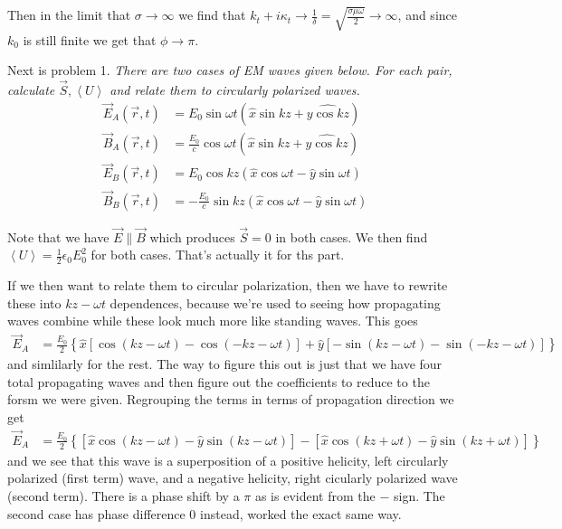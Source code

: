 \documentclass[10pt]{report}
\newcommand{\expvalue}[1]{\left<#1\right>}
\begin{document}
Then in the limit that $\sigma \to \infty$ we find that $k_t + i\kappa_t \to \frac{1}{\delta} = \sqrt{\frac{\sigma \mu \omega}{2}} \to \infty$, and since $k_0$ is still finite we get that $\phi \to \pi$. 

Next is problem 1. \emph{There are two cases of EM waves given below. For each pair, calculate $\vec{S}, \expvalue{U}$ and relate them to circularly polarized waves.}
\begin{align}
    \vec{E}_A(\vec{r},t) &= E_0\sin \omega t\left( \hat{x}\sin kz + \hat{y\cos kz} \right)\\
    \vec{B}_A(\vec{r},t) &= \frac{E_0}{c}\cos \omega t\left( \hat{x}\sin kz + \hat{y\cos kz} \right)\\
    \vec{E}_B(\vec{r},t) &= E_0\cos kz\left( \hat{x}\cos \omega t - \hat{y}\sin \omega t \right)\\
    \vec{B}_B(\vec{r},t) &= -\frac{E_0}{c}\sin kz\left( \hat{x}\cos \omega t - \hat{y}\sin \omega t \right)
\end{align}

Note that we have $\vec{E} \parallel \vec{B}$ which produces $\vec{S} = 0$ in both cases. We then find $\expvalue{U} = \frac{1}{2}\epsilon_0 E_0^2$ for both cases. That's actually it for ths part.

If we then want to relate them to circular polarization, then we have to rewrite these into $kz - \omega t$ dependences, because we're used to seeing how propagating waves combine while these look much more like standing waves. This goes
\begin{align}
    \vec{E}_A &= \frac{E_0}{2}\left\{ \hat{x}\left[ \cos(kz - \omega t) - \cos (-kz - \omega t) \right] + \hat{y}\left[ -\sin(kz - \omega t) - \sin(-kz - \omega t) \right] \right\}
\end{align}
and simlilarly for the rest. The way to figure this out is just that we have four total propagating waves and then figure out the coefficients to reduce to the forsm we were given. Regrouping the terms in terms of propagation direction we get
\begin{align}
    \vec{E}_A &= \frac{E_0}{2}\left\{ \left[\hat{x} \cos(kz - \omega t) - \hat{y}\sin(kz - \omega t)\right] - \left[\hat{x}\cos (kz + \omega t) - \hat{y}\sin(kz + \omega t)\right]\right\}
\end{align}
and we see that this wave is a superposition of a positive helicity, left circularly polarized (first term) wave, and a negative helicity, right cicularly polarized wave (second term). There is a phase shift by a $\pi$ as is evident from the $-$ sign. The second case has phase difference $0$ instead, worked the exact same way. 
\end{document}
